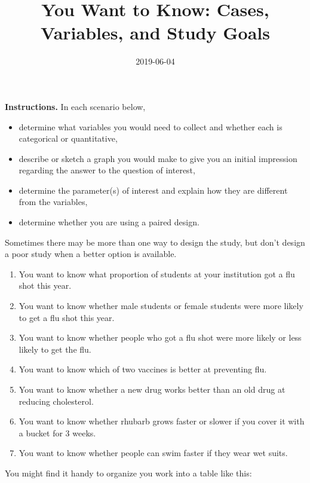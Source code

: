 \documentclass[]{article}
\title{You Want to Know: Cases, Variables, and Study Goals}
\author{}
\date{2019-06-04}
\providecommand{\tightlist}{%
  \setlength{\itemsep}{0pt}\setlength{\parskip}{0pt}}
\begin{document}
\maketitle

\pagestyle{empty}

\textbf{Instructions.} In each scenario below,

\begin{itemize}
\item
  determine what variables you would need to collect and whether each is
  categorical or quantitative,
\item
  describe or sketch a graph you would make to give you an initial
  impression regarding the answer to the question of interest,
\item
  determine the parameter(s) of interest and explain how they are
  different from the variables,
\end{itemize}

\begin{itemize}
\tightlist
\item
  determine whether you are using a paired design.
\end{itemize}

Sometimes there may be more than one way to design the study, but don't
design a poor study when a better option is available.

\begin{enumerate}
\def\labelenumi{\arabic{enumi}.}
\item
  You want to know what proportion of students at your institution got a
  flu shot this year.
\item
  You want to know whether male students or female students were more
  likely to get a flu shot this year.
\item
  You want to know whether people who got a flu shot were more likely or
  less likely to get the flu.
\item
  You want to know which of two vaccines is better at preventing flu.
\item
  You want to know whether a new drug works better than an old drug at
  reducing cholesterol.
\item
  You want to know whether rhubarb grows faster or slower if you cover
  it with a bucket for 3 weeks.
\item
  You want to know whether people can swim faster if they wear wet
  suits.
\end{enumerate}

You might find it handy to organize you work into a table like this:
\end{document}

